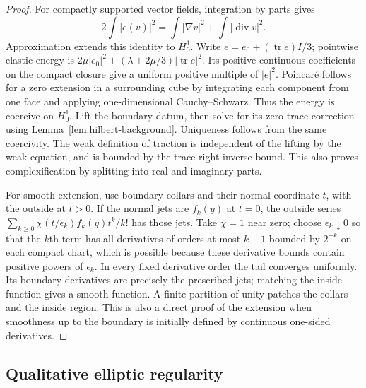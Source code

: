 \documentclass[11pt]{article}
\theoremstyle{remark}
\numberwithin{equation}{section}
\begin{document}
\begin{proof}
For compactly supported vector fields, integration by parts gives
\[
 2\int|e(v)|^2=\int|\nabla v|^2+\int|\operatorname{div}v|^2.
\]
Approximation extends this identity to $H^1_0$. Write
$e=e_0+(\operatorname{tr}e)I/3$; pointwise elastic energy is
$2\mu|e_0|^2+(\lambda+2\mu/3)|\operatorname{tr}e|^2$.
Its positive continuous coefficients on the compact closure give a
uniform positive multiple of $|e|^2$. Poincar\'e follows for a zero
extension in a surrounding cube by integrating each component from one
face and applying one-dimensional Cauchy--Schwarz. Thus the energy is
coercive on $H^1_0$. Lift the boundary datum, then solve for its zero-trace
correction using Lemma~\ref{lem:hilbert-background}. Uniqueness follows from
the same coercivity. The weak definition of traction is independent of
the lifting by the weak equation, and is bounded by the trace right-inverse
bound. This also proves complexification by splitting into real and
imaginary parts.

For smooth extension, use boundary collars and their normal coordinate
$t$, with the outside at $t>0$. If the normal jets are $f_k(y)$ at $t=0$,
the outside series
$\sum_{k\ge0}\chi(t/\epsilon_k)f_k(y)t^k/k!$ has those jets.
Take $\chi=1$ near zero; choose $\epsilon_k\downarrow0$ so that the
$k$th term has all derivatives of orders at most $k-1$ bounded by $2^{-k}$
on each compact chart, which is possible because these derivative bounds
contain positive powers of $\epsilon_k$. In every fixed derivative order
the tail converges uniformly. Its boundary derivatives are precisely the
prescribed jets; matching the inside function gives a smooth function.
A finite partition of unity patches the collars and the inside region.
This is also a direct proof of the extension when smoothness up to the
boundary is initially defined by continuous one-sided derivatives.
\end{proof}

\subsection{Qualitative elliptic regularity}
\end{document}
